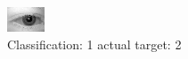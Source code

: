 \begin{figure}[h!]
\begin{center}
\includegraphics[width=0.60\columnwidth]{figures/ID413_class_1_target_2.png}
\end{center}
\caption{ Classification: 1 actual target: 2}
\label{fig:ID413_class_1_target_2}
\end{figure}
